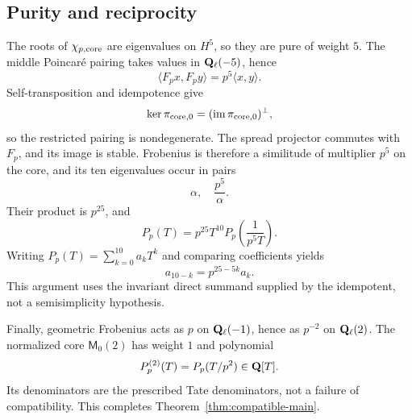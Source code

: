 \subsection{Purity and reciprocity}

The roots of \(\chi_{p,\mathrm{core}}\) are eigenvalues on \(H^5\), so they are
pure of weight \(5\).  The middle Poincar\'e pairing takes values in
\(\mathbf Q_\ell(-5)\), hence
\[
\langle F_px,F_py\rangle=p^5\langle x,y\rangle.
\]
Self-transposition and idempotence give
\[
\ker\pi_{\mathrm{core},0}=(\operatorname{im}\pi_{\mathrm{core},0})^\perp,
\]
so the restricted pairing is nondegenerate.  The spread projector commutes
with \(F_p\), and its image is stable.  Frobenius is therefore a similitude
of multiplier \(p^5\) on the core, and its ten eigenvalues occur in pairs
\[
\alpha,\quad \frac{p^5}{\alpha}.
\]
Their product is \(p^{25}\), and
\begin{equation}
P_p(T)=p^{25}T^{10}P_p\left(\frac1{p^5T}\right).
\label{eq:reciprocity}
\end{equation}
Writing \(P_p(T)=\sum_{k=0}^{10}a_kT^k\) and comparing coefficients yields
\[
a_{10-k}=p^{25-5k}a_k.
\]
This argument uses the invariant direct summand supplied by the idempotent,
not a semisimplicity hypothesis.

Finally, geometric Frobenius acts as \(p\) on \(\mathbf Q_\ell(-1)\), hence as
\(p^{-2}\) on \(\mathbf Q_\ell(2)\).  The normalized core
\(\mathsf M_0(2)\) has weight \(1\) and polynomial
\[
P_p^{(2)}(T)=P_p(T/p^2)\in\mathbf Q[T].
\]
Its denominators are the prescribed Tate denominators, not a failure of
compatibility.  This completes Theorem~\ref{thm:compatible-main}.
